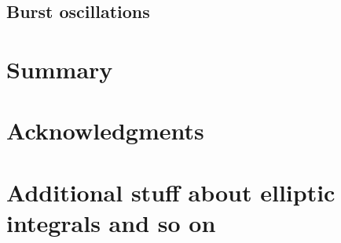 \documentclass[iop, usenatbib]{emulateapj}
\begin{document}
\subsection{Burst oscillations}



\section{Summary}

\section*{Acknowledgments}










\clearpage
\appendix

\section{Additional stuff about elliptic integrals and so on}
\end{document}
